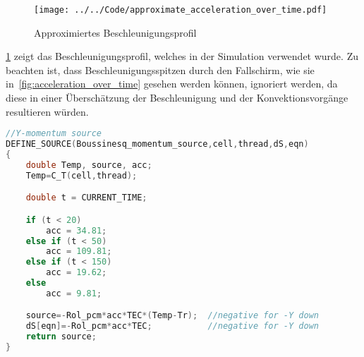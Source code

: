 \begin{figure}[H]
  \centering
  \texttt{[image: ../../Code/approximate\_acceleration\_over\_time.pdf]}
  \caption{Approximiertes Beschleunigungsprofil}\label{fig:approximierte_beschleunigung}
\end{figure}

\ref{fig:approximierte_beschleunigung} zeigt das Beschleunigungsprofil, welches in der Simulation verwendet wurde. Zu beachten
ist, dass Beschleunigungsspitzen durch den Fallschirm, wie sie in~\ref{fig:acceleration_over_time} gesehen
werden können, ignoriert werden, da diese in einer Überschätzung der Beschleunigung und der Konvektionsvorgänge resultieren würden.

\begin{lstlisting}[language=C, float, caption={Boussinesq-Approximation des Auftriebs im \ac{pcm} in der \ac{udf} eicosane.c}, label={lst:udf_bossinesque}]
//Y-momentum source
DEFINE_SOURCE(Boussinesq_momentum_source,cell,thread,dS,eqn)
{
	double Temp, source, acc;
	Temp=C_T(cell,thread);

	double t = CURRENT_TIME;

	if (t < 20)
		acc = 34.81;
	else if (t < 50)
		acc = 109.81;
	else if (t < 150)
		acc = 19.62;
	else
		acc = 9.81;

	source=-Rol_pcm*acc*TEC*(Temp-Tr);  //negative for -Y down
	dS[eqn]=-Rol_pcm*acc*TEC; 			//negative for -Y down
	return source;
}
\end{lstlisting}

